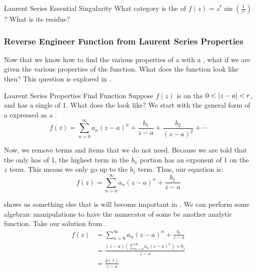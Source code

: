 \begin{example}{Laurent Series Essential Singularity}
  What category is the  of $f(z) = z^{7} \sin \left( \frac{1}{z^{2}} \right)$?
  What is its residue?
  \tcblower{}

\end{example}

\subsubsection{Reverse Engineer Function from Laurent Series Properties}\label{subsubsec:Reverse_Engineer_Function_from_Laurent_Series_Properties}
Now that we know how to find the various properties of a  with a , what if we are given the various properties of the function.
What does the function look like then?
This question is explored in .

\begin{example}{Laurent Series Properties Find Function}
  Suppose $f(z)$ is  on the  $0 < \left\lvert z-a \right\rvert < r$, and has a single  of  1.
  What does the  look like?
  \tcblower{}
  We start with the general form of a  expressed as a .
  \begin{equation*}
    f(z) = \sum_{n=0}^{\infty} a_{n} {(z-a)}^{n} + \frac{b_{1}}{z-a} + \frac{b_{2}}{{(z-a)}^{2}} + \cdots
  \end{equation*}

  Now, we remove terms and items that we do not need.
  Because we are told that the only  has  of 1, the highest term in the $b_{n}$ portion has an exponent of $1$ on the $z$ term.
  This means we only go up to the $b_{1}$ term.
  Thus, our equation is:
  \begin{equation*}
    f(z) = \sum_{n=0}^{\infty} a_{n} {(z-a)}^{n} + \frac{b_{1}}{z-a}
  \end{equation*}
\end{example}

 shows us something else that is will become important in .
We can perform some algebraic manipulations to have the numerator of some   be another analytic function.
Take our solution from .
\begin{align*}
  f(z) &= \sum_{n=0}^{\infty} a_{n} {(z-a)}^{n} + \frac{b_{1}}{z-a} \\
       &= \frac{(z-a) \left( \sum_{n=0}^{\infty} a_{n} {(z-a)}^{n} \right) + b_{1}}{z-a} \\
       &= \frac{g(z)}{z-a}
\end{align*}

